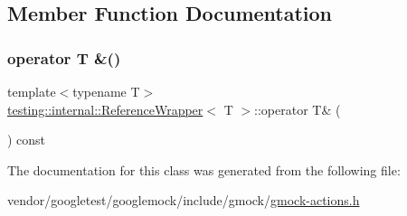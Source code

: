 \subsection{Member Function Documentation}
\mbox{\label{classtesting_1_1internal_1_1_reference_wrapper_a187d6e6ffb4031444fff10dee7dc7de8}} 
\subsubsection{\texorpdfstring{operator T \&()}{operator T \&()}}
{\footnotesize\ttfamily template$<$typename T$>$ \\
\hyperlink{classtesting_1_1internal_1_1_reference_wrapper}{testing\+::internal\+::\+Reference\+Wrapper}$<$ T $>$\+::operator T\& (\begin{DoxyParamCaption}{ }\end{DoxyParamCaption}) const\hspace{0.3cm}{\ttfamily [inline]}}



The documentation for this class was generated from the following file\+:\begin{DoxyCompactItemize}
\item 
vendor/googletest/googlemock/include/gmock/\hyperlink{gmock-actions_8h}{gmock-\/actions.\+h}\end{DoxyCompactItemize}
